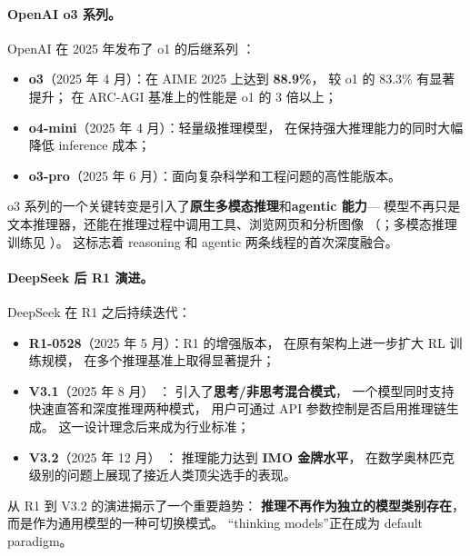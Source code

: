 \paragraph{OpenAI o3 系列。}
OpenAI 在 2025 年发布了 o1 的后继系列 \cite{openai2025o3}：
\begin{itemize}[leftmargin=2em]
  \item \textbf{o3}（2025 年 4 月）：在 AIME 2025 上达到 \textbf{88.9\%}，
    较 o1 的 83.3\% 有显著提升；
    在 ARC-AGI 基准上的性能是 o1 的 3 倍以上；
  \item \textbf{o4-mini}（2025 年 4 月）：轻量级推理模型，
    在保持强大推理能力的同时大幅降低 inference 成本；
  \item \textbf{o3-pro}（2025 年 6 月）：面向复杂科学和工程问题的高性能版本。
\end{itemize}
o3 系列的一个关键转变是引入了\textbf{原生多模态推理}和\textbf{agentic 能力}---
模型不再只是文本推理器，还能在推理过程中调用工具、浏览网页和分析图像
（；多模态推理训练见 ）。
这标志着 reasoning 和 agentic 两条线程的首次深度融合。

\paragraph{DeepSeek 后 R1 演进。}
DeepSeek 在 R1 之后持续迭代：
\begin{itemize}[leftmargin=2em]
  \item \textbf{R1-0528}（2025 年 5 月）：R1 的增强版本，
    在原有架构上进一步扩大 RL 训练规模，
    在多个推理基准上取得显著提升；
  \item \textbf{V3.1}（2025 年 8 月） \cite{deepseek2024v3}：
    引入了\textbf{思考/非思考混合模式}，
    一个模型同时支持快速直答和深度推理两种模式，
    用户可通过 API 参数控制是否启用推理链生成。
    这一设计理念后来成为行业标准；
  \item \textbf{V3.2}（2025 年 12 月） \cite{deepseek2025v32}：
    推理能力达到 \textbf{IMO 金牌水平}，
    在数学奥林匹克级别的问题上展现了接近人类顶尖选手的表现。
\end{itemize}

\noindent
从 R1 到 V3.2 的演进揭示了一个重要趋势：
\textbf{推理不再作为独立的模型类别存在}，
而是作为通用模型的一种可切换模式。
``thinking models''正在成为 default paradigm。

